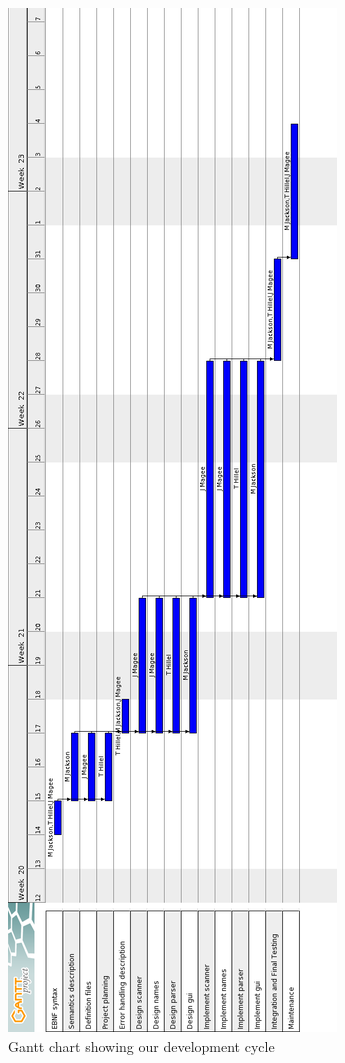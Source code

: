 \documentclass[a4paper,10pt]{article}
\begin{document}
\begin{figure}[h]
 \centering
  \includegraphics[height=.75\textheight]{../../report1/Gantt-Chart.png}
 \caption{Gantt chart showing our development cycle}
 \label{fig:ganttchart}
\end{figure}
\pagebreak
\end{document}
